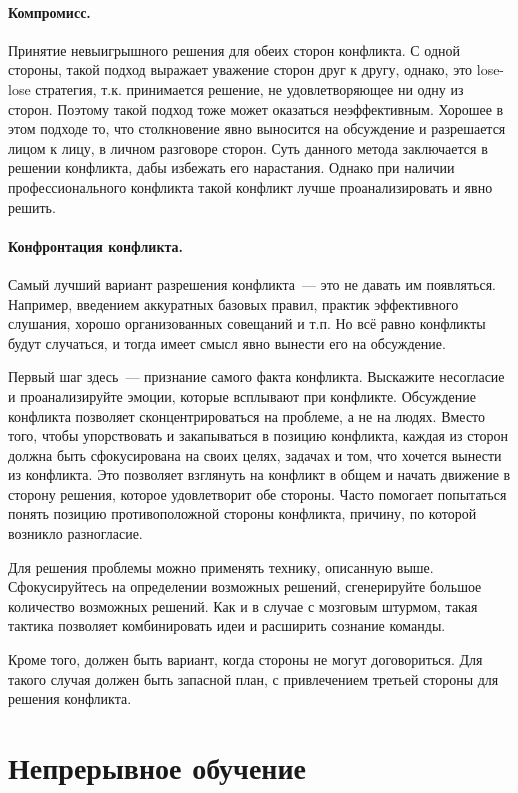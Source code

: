 \documentclass{../../text-style}
\begin{document}
\paragraph*{Компромисс.} Принятие невыигрышного решения для обеих сторон конфликта. С одной стороны, такой подход выражает уважение сторон друг к другу, однако, это lose-lose стратегия, т.к. принимается решение, не удовлетворяющее ни одну из сторон. Поэтому такой подход тоже может оказаться неэффективным. Хорошее в этом подходе то, что столкновение явно выносится на обсуждение и разрешается лицом к лицу, в личном разговоре сторон. Суть данного метода заключается в решении конфликта, дабы избежать его нарастания. Однако при наличии профессионального конфликта такой конфликт лучше проанализировать и явно решить.

\paragraph*{Конфронтация конфликта.} Самый лучший вариант разрешения конфликта~--- это не давать им появляться. Например, введением аккуратных базовых правил, практик эффективного слушания, хорошо организованных совещаний и т.п. Но всё равно конфликты будут случаться, и тогда имеет смысл явно вынести его на обсуждение.

Первый шаг здесь~--- признание самого факта конфликта. Выскажите несогласие и проанализируйте эмоции, которые всплывают при конфликте. Обсуждение конфликта позволяет сконцентрироваться на проблеме, а не на людях. Вместо того, чтобы упорствовать и закапываться в позицию конфликта, каждая из сторон должна быть сфокусирована на своих целях, задачах и том, что хочется вынести из конфликта. Это позволяет взглянуть на конфликт в общем и начать движение в сторону решения, которое удовлетворит обе стороны. Часто помогает попытаться понять позицию противоположной стороны конфликта, причину, по которой возникло разногласие.

Для решения проблемы можно применять технику, описанную выше. Сфокусируйтесь на определении возможных решений, сгенерируйте большое количество возможных решений. Как и в случае с мозговым штурмом, такая тактика позволяет комбинировать идеи и расширить сознание команды.

Кроме того, должен быть вариант, когда стороны не могут договориться. Для такого случая должен быть запасной план, с привлечением третьей стороны для решения конфликта.

\section{Непрерывное обучение}
\end{document}
